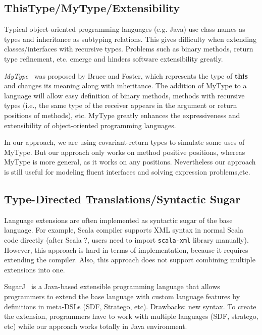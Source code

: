 

\subsection{ThisType/MyType/Extensibility}
Typical object-oriented programming languages (e.g. Java) use class names as
types and inheritance as subtyping relations. This gives difficulty when
extending classes/interfaces with recursive types. Problems such as binary
methods, return type refinement, etc. emerge and hinders software extensibility
greatly.

\emph{MyType}~\cite{bruce1994paradigmatic} was proposed by Bruce and Foster,
which represents the type of \textbf{this} and changes its meaning along with
inheritance. The addition of MyType to a language will allow easy definition of
binary methods, methods with recursive types (i.e., the same type of the
receiver appears in the argument or return positions of methods), etc. MyType
greatly enhances the expressiveness and extensibility of object-oriented
programming languages. 

In our approach, we are using covariant-return types to simulate some uses of
MyType. But our approach only works on method positive positions, whereas MyType
is more general, as it works on any positions. Nevertheless our approach is
still useful for modeling fluent interfaces and solving expression
problems,etc. 

\subsection{Type-Directed Translations/Syntactic Sugar}
Language extensions are often implemented as syntactic sugar of the base
language. For example, Scala compiler supports XML syntax in normal Scala code
directly (after Scala ?, users need to import \texttt{scala-xml} library
manually). However, this approach is hard in terms of implementation, because it
requires extending the compiler. Also, this approach does not support combining
multiple extensions into one.

SugarJ~\cite{erdweg11sugarj} is a Java-based extensible programming language
that allows programmers to extend the base language with custom language
features by definitions in meta-DSLs (SDF, Stratego, etc). 
  Drawbacks: new
syntax. To create the extension, programmers have to work with multiple
languages (SDF, stratego, etc) while our approach works totally in Java
environment.

